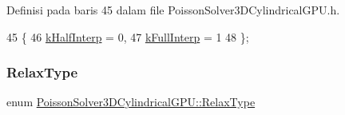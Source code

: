 Definisi pada baris 45 dalam file Poisson\+Solver3\+D\+Cylindrical\+G\+P\+U.\+h.


\begin{DoxyCode}
45                   \{
46     \hyperlink{classPoissonSolver3DCylindricalGPU_a8ef2ee39d1bfa64bc4724349f4a4e07aa697ed9274ff84e68a071627f249dd298}{kHalfInterp} = 0,    
47     \hyperlink{classPoissonSolver3DCylindricalGPU_a8ef2ee39d1bfa64bc4724349f4a4e07aa150731880e4a55bbd718c6c18d579719}{kFullInterp} = 1    
48   \};
\end{DoxyCode}
\hypertarget{classPoissonSolver3DCylindricalGPU_a2477dcc6ced1975ec64f20136f8b8499}{}\label{classPoissonSolver3DCylindricalGPU_a2477dcc6ced1975ec64f20136f8b8499} 
\subsubsection{\texorpdfstring{Relax\+Type}{RelaxType}}
{\footnotesize\ttfamily enum \hyperlink{classPoissonSolver3DCylindricalGPU_a2477dcc6ced1975ec64f20136f8b8499}{Poisson\+Solver3\+D\+Cylindrical\+G\+P\+U\+::\+Relax\+Type}}

